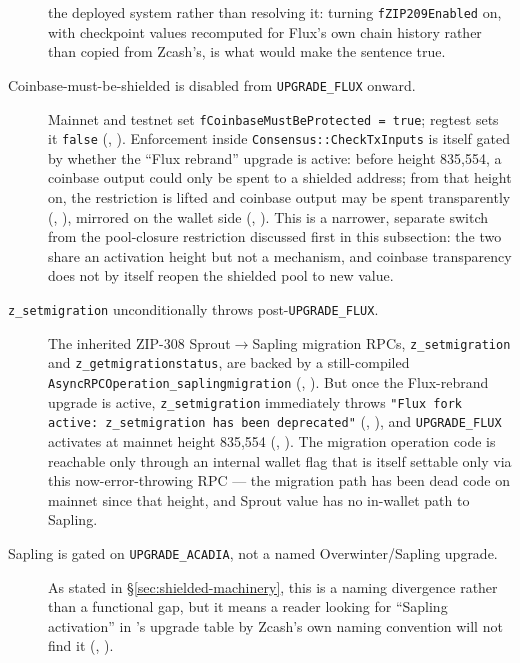 \begin{description}
  the deployed system rather than resolving it: turning \texttt{fZIP209Enabled} on, with checkpoint
  values recomputed for Flux's own chain history rather than copied from Zcash's, is what would make
  the sentence true.
\item[Coinbase-must-be-shielded is disabled from \texttt{UPGRADE\_FLUX} onward.] Mainnet and testnet
  set \texttt{f\allowbreak{}Coinbase\allowbreak{}Must\allowbreak{}Be\allowbreak{}Protected = true}; regtest sets it \texttt{false} (\shipped,
  ). Enforcement inside
  \texttt{Consensus::\allowbreak{}Check\allowbreak{}Tx\allowbreak{}Inputs} is itself gated by whether the ``Flux rebrand'' upgrade is active:
  before height 835{,}554, a coinbase output could only be spent to a shielded address; from that
  height on, the restriction is lifted and coinbase output may be spent transparently (\shipped,
  ), mirrored on the wallet side (\shipped,
  ). This is a narrower, separate switch from the pool-closure
  restriction discussed first in this subsection: the two share an activation height but not a
  mechanism, and coinbase transparency does not by itself reopen the shielded pool to new value.
\item[\texttt{z\_setmigration} unconditionally throws post-\texttt{UPGRADE\_FLUX}.] The inherited
  ZIP-308 Sprout$\to$Sapling migration RPCs, \texttt{z\_setmigration} and
  \texttt{z\_getmigrationstatus}, are backed by a still-compiled
  \texttt{Async\allowbreak{}RPCOperation\_saplingmigration} (\shipped,
  ). But once the Flux-rebrand
  upgrade is active, \texttt{z\_setmigration} immediately throws
  \texttt{"Flux fork active:\allowbreak{} z\_setmigration has been deprecated"} (\shipped,
  ), and \texttt{UPGRADE\_FLUX} activates at mainnet
  height 835{,}554 (\shipped, ). The migration operation
  code is reachable only through an internal wallet flag that is itself settable only via this
  now-error-throwing RPC — the migration path has been dead code on mainnet since that height, and
  Sprout value has no in-wallet path to Sapling.
\item[Sapling is gated on \texttt{UPGRADE\_ACADIA}, not a named Overwinter/Sapling upgrade.] As stated
  in \S\ref{sec:shielded-machinery}, this is a naming divergence rather than a functional gap, but it
  means a reader looking for ``Sapling activation'' in \fluxd's upgrade table by Zcash's own naming
  convention will not find it (\shipped, ).
\end{description}

